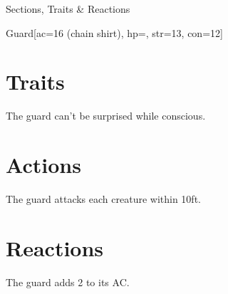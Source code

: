 \begin{ExampleBlock}{Sections, Traits \& Reactions}
\begin{RpgStat}{Guard}[ac=16 (chain shirt), hp=, str=13, con=12]
    \section{Traits}
         The guard can't be surprised while conscious.
    \section{Actions}
         The guard attacks each creature within 10ft.
    \section{Reactions}
         The guard adds 2 to its AC.
\end{RpgStat}


\end{ExampleBlock}
